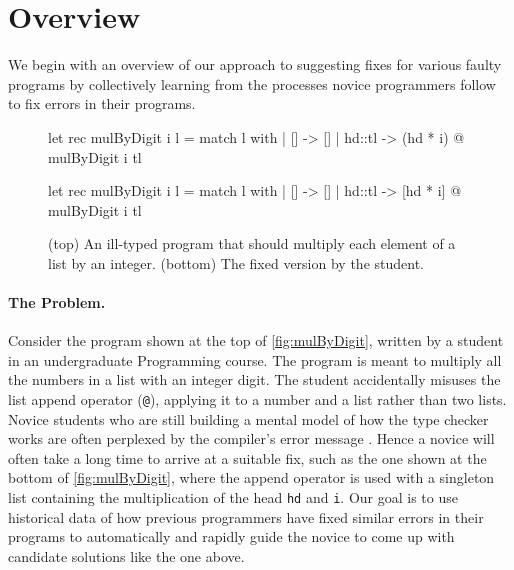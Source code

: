 \section{Overview}
\label{sec:overview}

We begin with an overview of our approach to suggesting fixes for various faulty
programs by collectively learning from the processes novice programmers follow
to fix errors in their programs.

\begin{figure}[ht]
\begin{ecode}
let rec mulByDigit i l =
  match l with
  | []     -> []
  | hd::tl -> (hd * i) @ mulByDigit i tl
\end{ecode}

\begin{ecode}
let rec mulByDigit i l =
  match l with
  | []     -> []
  | hd::tl -> [hd * i] @ mulByDigit i tl
\end{ecode}
\caption{(top) An ill-typed \ocaml program that should multiply each element
of a list by an integer. (bottom) The fixed version by the student.}
\label{fig:mulByDigit}
\end{figure}


\paragraph{The Problem.} Consider the program \mbd shown at the top of
\autoref{fig:mulByDigit}, written by a student in an undergraduate Programming
course. The program is meant to multiply all the numbers in a list with an
integer digit. The student accidentally misuses the list append operator
(\texttt{@}), applying it to a number and a list rather than two lists.
%
Novice students who are still building a mental model of how the type checker
works are often perplexed by the compiler's error message \cite{FIXME}. Hence a
novice will often take a long time to arrive at a suitable fix, such as the one
shown at the bottom of \autoref{fig:mulByDigit}, where the append operator is
used with a singleton list containing the multiplication of the head \texttt{hd}
and \texttt{i}.
%
Our goal is to use historical data of how previous programmers have fixed
similar errors in their programs to automatically and rapidly guide the novice
to come up with candidate solutions like the one above.


